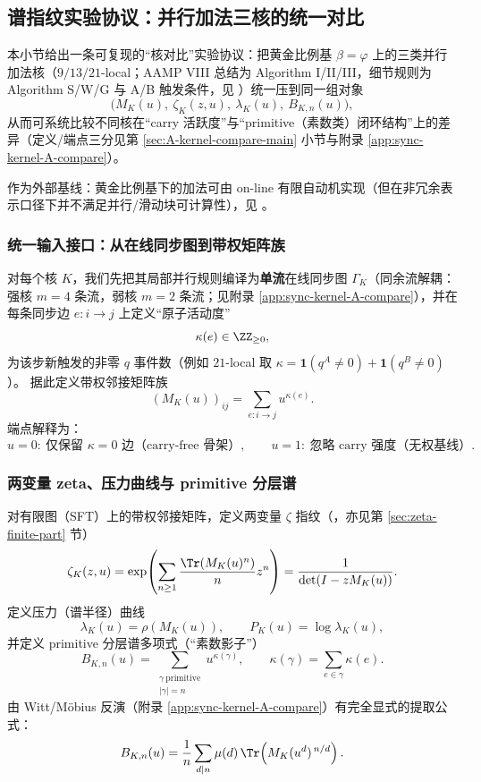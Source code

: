 \subsection{谱指纹实验协议：并行加法三核的统一对比}\label{sec:exp-kernel-fingerprint}
本小节给出一条可复现的“核对比”实验协议：把黄金比例基 $\beta=\varphi$ 上的三类并行加法核（$9/13/21$-local；AAMP VIII 总结为 Algorithm I/II/III，细节规则为 Algorithm S/W/G 与 A/B 触发条件，见 \cite{SvobodovaAAMPVIIIParallelAddition,FrougnyHellerPelantovaSvobodovaParallelAlgorithmsSlides}）统一压到同一组对象
\[
\bigl(M_K(u),\ \zeta_K(z,u),\ \lambda_K(u),\ B_{K,n}(u)\bigr),
\]
从而可系统比较不同核在“carry 活跃度”与“primitive（素数类）闭环结构”上的差异（定义/端点三分见第 \ref{sec:A-kernel-compare-main} 小节与附录 \ref{app:sync-kernel-A-compare}）。
\par
作为外部基线：黄金比例基下的加法可由 on-line 有限自动机实现（但在非冗余表示口径下并不满足并行/滑动块可计算性），见 \cite{Frougny1999OnlineAddition}。

\subsubsection{统一输入接口：从在线同步图到带权矩阵族}
对每个核 $K$，我们先把其局部并行规则编译为\textbf{单流}在线同步图 $\Gamma_K$（同余流解耦：强核 $m=4$ 条流，弱核 $m=2$ 条流；见附录 \ref{app:sync-kernel-A-compare}），并在每条同步边 $e:i\to j$ 上定义“原子活动度”
\[
\kappa(e)\in\ZZ_{\ge 0},
\]
为该步新触发的非零 $q$ 事件数（例如 $21$-local 取 $\kappa=\mathbf{1}(q^A\neq 0)+\mathbf{1}(q^B\neq 0)$）。
据此定义带权邻接矩阵族
\[
(M_K(u))_{ij}=\sum_{e:i\to j}u^{\kappa(e)}.
\]
端点解释为：
\[
u=0:\ \text{仅保留 $\kappa=0$ 边（carry-free 骨架）},\qquad
u=1:\ \text{忽略 carry 强度（无权基线）}.
\]

\subsubsection{两变量 zeta、压力曲线与 primitive 分层谱}
对有限图（SFT）上的带权邻接矩阵，定义两变量 $\zeta$ 指纹（\cite{BrinStuck2002}，亦见第 \ref{sec:zeta-finite-part} 节）
\[
\zeta_K(z,u)
=\exp\!\left(\sum_{n\ge 1}\frac{\Tr(M_K(u)^n)}{n}z^n\right)
=\frac{1}{\det(I-zM_K(u))}.
\]
定义压力（谱半径）曲线
\[
\lambda_K(u)=\rho(M_K(u)),\qquad P_K(u)=\log\lambda_K(u),
\]
并定义 primitive 分层谱多项式（“素数影子”）
\[
B_{K,n}(u)=\sum_{\substack{\gamma\ \mathrm{primitive}\\|\gamma|=n}}u^{\kappa(\gamma)},
\qquad \kappa(\gamma)=\sum_{e\in\gamma}\kappa(e).
\]
由 Witt/Möbius 反演（附录 \ref{app:sync-kernel-A-compare}）有完全显式的提取公式：
\[
B_{K,n}(u)=\frac{1}{n}\sum_{d\mid n}\mu(d)\,\Tr\!\left(M_K(u^d)^{\,n/d}\right).
\]

